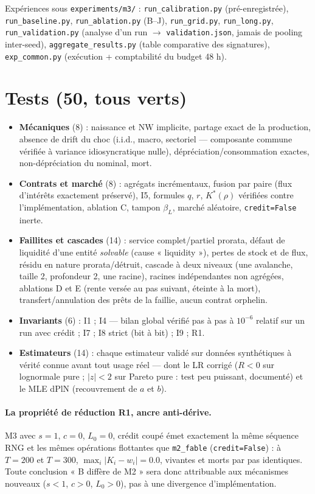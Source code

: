 \documentclass[11pt,a4paper]{article}
\newcommand{\NW}{\mathrm{NW}}
\newcommand{\code}[1]{\texttt{#1}}
\begin{document}
Expériences sous \code{experiments/m3/} : \code{run\_calibration.py}
(pré-enregistrée), \code{run\_baseline.py}, \code{run\_ablation.py} (B--J),
\code{run\_grid.py}, \code{run\_long.py}, \code{run\_validation.py}
(analyse d'un run $\to$ \code{validation.json}, jamais de pooling
inter-seed), \code{aggregate\_results.py} (table comparative des signatures),
\code{exp\_common.py} (exécution + comptabilité du budget 48 h).

\section{Tests (50, tous verts)}

\begin{itemize}[leftmargin=1.5em, itemsep=2pt]
\item \textbf{Mécaniques} (8) : naissance et $\NW$ implicite, partage exact
  de la production, absence de drift du choc (i.i.d., macro, sectoriel —
  composante commune vérifiée à variance idiosyncratique nulle),
  dépréciation/consommation exactes, non-dépréciation du nominal, mort.
\item \textbf{Contrats et marché} (8) : agrégats incrémentaux, fusion par
  paire (flux d'intérêts exactement préservé), I5, formules $q$, $r$,
  $K^*(\rho)$ vérifiées contre l'implémentation, ablation C, tampon
  $\beta_L$, marché aléatoire, \code{credit=False} inerte.
\item \textbf{Faillites et cascades} (14) : service complet/partiel prorata,
  défaut de liquidité d'une entité \emph{solvable} (cause « liquidity »),
  pertes de stock et de flux, résidu en nature prorata/détruit, cascade à
  deux niveaux (une avalanche, taille 2, profondeur 2, une racine), racines
  indépendantes non agrégées, ablations D et E (rente versée au pas suivant,
  éteinte à la mort), transfert/annulation des prêts de la faillie, aucun
  contrat orphelin.
\item \textbf{Invariants} (6) : I1 ; I4 --- bilan global vérifié pas à pas à
  $10^{-6}$ relatif sur un run avec crédit ; I7 ; I8 strict (bit à bit) ;
  I9 ; R1.
\item \textbf{Estimateurs} (14) : chaque estimateur validé sur données
  synthétiques à vérité connue avant tout usage réel --- dont le LR corrigé
  ($R<0$ sur lognormale pure ; $|z|<2$ sur Pareto pure : test peu puissant,
  documenté) et le MLE dPlN (recouvrement de $a$ et $b$).
\end{itemize}

\paragraph{La propriété de réduction R1, ancre anti-dérive.} M3 avec
$s{=}1$, $c{=}0$, $L_0{=}0$, crédit coupé émet exactement la même séquence
RNG et les mêmes opérations flottantes que \code{m2\_fable}
(\code{credit=False}) : à $T{=}200$ et $T{=}300$, $\max_i |K_i - w_i| = 0.0$,
vivantes et morts par pas identiques. Toute conclusion « B diffère de M2 »
sera donc attribuable aux mécanismes nouveaux ($s<1$, $c>0$, $L_0>0$), pas à
une divergence d'implémentation.
\end{document}
